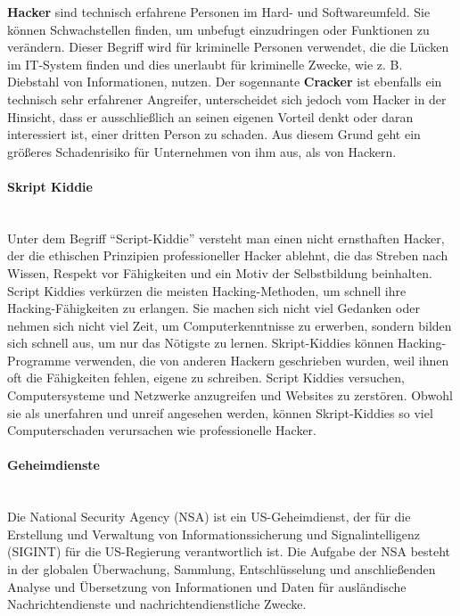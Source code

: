 \textbf{Hacker} sind technisch erfahrene Personen im Hard- und Softwareumfeld. Sie können Schwachstellen finden, um unbefugt einzudringen oder Funktionen zu verändern\cite{hack17}. Dieser Begriff wird für kriminelle Personen verwendet, die die Lücken im IT-System finden und dies unerlaubt für kriminelle Zwecke, wie z. B. Diebstahl von Informationen, nutzen\cite{hack11}. 
Der sogennante \textbf{Cracker} ist ebenfalls ein technisch sehr erfahrener Angreifer, unterscheidet sich jedoch vom Hacker in der Hinsicht, dass er ausschließlich an seinen eigenen Vorteil denkt oder daran interessiert ist, einer dritten Person zu schaden. Aus diesem Grund geht ein größeres Schadenrisiko für Unternehmen von ihm aus, als von Hackern\cite[45]{eckert2013sicherheit}.

\paragraph{Skript Kiddie}\mbox{}\\

Unter dem Begriff "`Script-Kiddie"' versteht man einen nicht ernsthaften Hacker, der die ethischen Prinzipien professioneller Hacker ablehnt, die das Streben nach Wissen, Respekt vor Fähigkeiten und ein Motiv der Selbstbildung beinhalten. Script Kiddies verkürzen die meisten Hacking-Methoden, um schnell ihre Hacking-Fähigkeiten zu erlangen. Sie machen sich nicht viel Gedanken oder nehmen sich nicht viel Zeit, um Computerkenntnisse zu erwerben, sondern bilden sich schnell aus, um nur das Nötigste zu lernen. Skript-Kiddies können Hacking-Programme verwenden, die von anderen Hackern geschrieben wurden, weil ihnen oft die Fähigkeiten fehlen, eigene zu schreiben. Script Kiddies versuchen, Computersysteme und Netzwerke anzugreifen und Websites zu zerstören. Obwohl sie als unerfahren und unreif angesehen werden, können Skript-Kiddies so viel Computerschaden verursachen wie professionelle Hacker\cite{scriptkiddie11}.

\paragraph{Geheimdienste}\mbox{}\\

Die National Security Agency (NSA) ist ein US-Geheimdienst, der für die Erstellung und Verwaltung von Informationssicherung und Signalintelligenz (SIGINT) für die US-Regierung verantwortlich ist. Die Aufgabe der NSA besteht in der globalen Überwachung, Sammlung, Entschlüsselung und anschließenden Analyse und Übersetzung von Informationen und Daten für ausländische Nachrichtendienste und nachrichtendienstliche Zwecke\cite{nsa14}.

